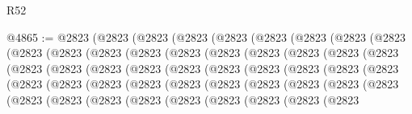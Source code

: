 \begin{lexlean}{R52}
\begin{coremodule}
@4865 := @2823
    (@2823
      (@2823
        (@2823
          (@2823
            (@2823
              (@2823
                (@2823
                  (@2823
                    (@2823
                      (@2823
                        (@2823
                          (@2823
                            (@2823
                              (@2823
                                (@2823
                                  (@2823
                                    (@2823
                                      (@2823
                                        (@2823
                                          (@2823
                                            (@2823
                                              (@2823
                                                (@2823
                                                  (@2823
                                                    (@2823
                                                      (@2823
                                                        (@2823
                                                          (@2823
                                                            (@2823
                                                              (@2823
                                                                (@2823
                                                                  (@2823
                                                                    (@2823
                                                                      (@2823
                                                                        (@2823
                                                                          (@2823
                                                                            (@2823
                                                                              (@2823
                                                                                (@2823
                                                                                  (@2823
                                                                                    (@2823
                                                                                      (@2823
                                                                                        (@2823
                                                                                          (@2823
                                                                                            (@2823
                                                                                              (@2823
                                                                                                (@2823

\end{coremodule}
\end{lexlean}
